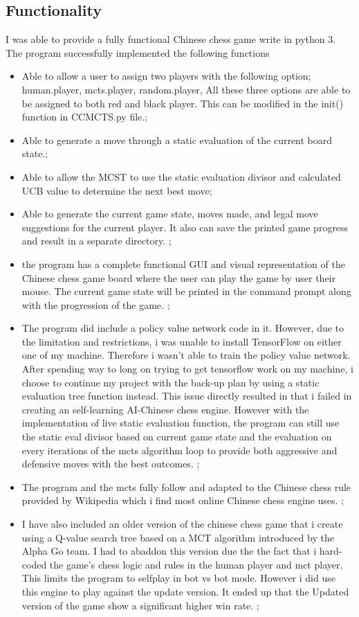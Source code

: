 \documentclass[10pt,twocolumn]{article}
\begin{document}
\subsection{Functionality}
    I was able to provide a fully functional Chinese chess game write in python 3. The program successfully implemented the following functions 
        \begin{itemize}
    \item Able to allow a user to assign two players with the following option; human.player, mcts.player, random.player, All these three options are able to be assigned to both red and black player. This can be modified in the init() function in CCMCTS.py file.;
    \item Able to generate a move through a static evaluation of the current board state.;
    \item Able to allow the MCST to use the static evaluation divisor and calculated UCB value to determine the next best move;
    \item Able to generate the current game state, moves made, and legal move suggestions for the current player. It also can save the printed game progress and result in a separate directory. ;
    \item the program has a complete functional GUI and visual representation of the Chinese chess game board where the user can play the game by user their mouse. The current game state will be printed in the command prompt along with the progression of the game. ;
    \item The program did include a policy value network code in it. However, due to the limitation and restrictions, i was unable to install TensorFlow on either one of my machine. Therefore i wasn't able to train the policy value network. After spending way to long on trying to get tensorflow work on my machine, i choose to continue my project with the back-up plan by using a static evaluation tree function instead. This issue directly resulted in that i failed in creating an self-learning AI-Chinese chess engine. However with the implementation of live static evaluation function, the program can still use the static eval divisor based on current game state and the evaluation on every iterations of the mcts algorithm loop to provide both aggressive and defensive moves with the best outcomes. ;
    \item The program and the mcts fully follow and adapted to the Chinese chess rule provided by Wikipedia which i find most online Chinese chess engine uses. ;
    \item I have also included an older version of the chinese chess game that i create using a Q-value search tree based on a MCT algorithm introduced by the Alpha Go team. I had to abaddon this version due the the fact that i hard-coded the game's chess logic and rules in the human player and mct player. This limits the program to selfplay in bot vs bot mode. However i did use this engine to play against the update version. It ended up that the Updated version of the game show a significant higher win rate. ;
\end{itemize}
\end{document}
